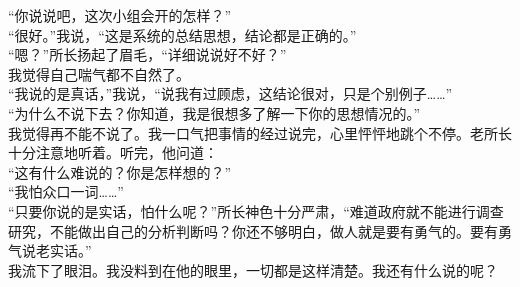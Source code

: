 “你说说吧，这次小组会开的怎样？”\\

“很好。”我说，“这是系统的总结思想，结论都是正确的。”\\

“嗯？”所长扬起了眉毛，“详细说说好不好？”\\

我觉得自己喘气都不自然了。\\

“我说的是真话，”我说，“说我有过顾虑，这结论很对，只是个别例子……”\\

“为什么不说下去？你知道，我是很想多了解一下你的思想情况的。”\\

我觉得再不能不说了。我一口气把事情的经过说完，心里怦怦地跳个不停。老所长十分注意地听着。听完，他问道：\\

“这有什么难说的？你是怎样想的？”\\

“我怕众口一词……”\\

“只要你说的是实话，怕什么呢？”所长神色十分严肃，“难道政府就不能进行调查研究，不能做出自己的分析判断吗？你还不够明白，做人就是要有勇气的。要有勇气说老实话。”\\

我流下了眼泪。我没料到在他的眼里，一切都是这样清楚。我还有什么说的呢？